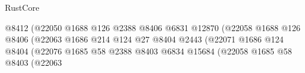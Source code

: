 \begin{lexlean}{RustCore}
\begin{coremodule}
                                                              @8412
                                                              (@22050
                                                                @1688
                                                                @126
                                                                @2388
                                                                @8406
                                                                @6831
                                                                @12870
                                                                (@22058
                                                                  @1688
                                                                  @126
                                                                  @8406
                                                                  (@22063
                                                                    @1686
                                                                    @214
                                                                    @124
                                                                    @27
                                                                    @8404
                                                                    @2443
                                                                    (@22071
                                                                      @1686
                                                                      @124
                                                                      @8404
                                                                      (@22076
                                                                        @1685
                                                                        @58
                                                                        @2388
                                                                        @8403
                                                                        @6834
                                                                        @15684
                                                                        (@22058
                                                                          @1685
                                                                          @58
                                                                          @8403
                                                                          (@22063

\end{coremodule}
\end{lexlean}
